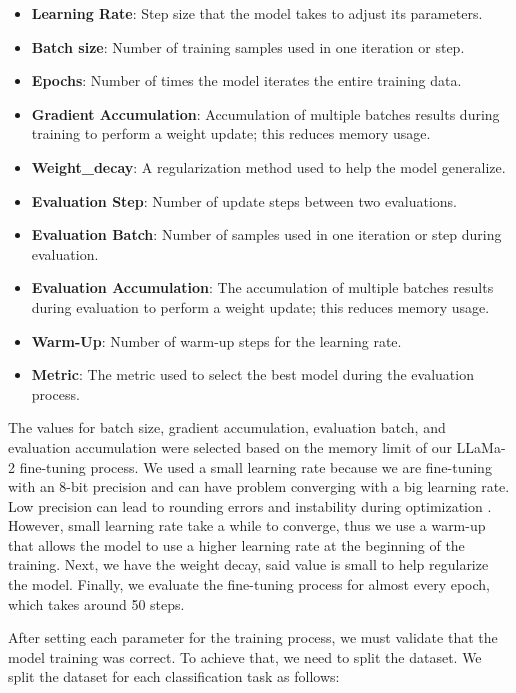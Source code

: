 \begin{itemize}
\item{\textbf{Learning Rate}}: Step size that the model takes to adjust its parameters.
\item{\textbf{Batch size}}: Number of training samples used in one iteration or step.
\item{\textbf{Epochs}}: Number of times the model iterates the entire training data.
\item{\textbf{Gradient Accumulation}}: Accumulation of multiple batches results during training to perform a weight update; this reduces memory usage.
\item{\textbf{Weight\_decay}}: A regularization method used to help the model generalize.
\item{\textbf{Evaluation Step}}: Number of update steps between two evaluations.
\item{\textbf{Evaluation Batch}}: Number of samples used in one iteration or step during evaluation.
\item{\textbf{Evaluation Accumulation}}: The accumulation of multiple batches results during evaluation to perform a weight update; this reduces memory usage.
\item{\textbf{Warm-Up}}: Number of warm-up steps for the learning rate.
\item{\textbf{Metric}}: The metric used to select the best model during the evaluation process.

\end{itemize}

\noindent The values for batch size, gradient accumulation, evaluation batch, and evaluation accumulation were selected based on the memory limit of our LLaMa-2 fine-tuning process. We used a small learning rate because we are fine-tuning with an 8-bit precision and can have problem converging with a big learning rate. Low precision can lead to rounding errors and instability during optimization \cite{jin2023rethinkinglearningratetuning}. However, small learning rate take a while to converge, thus we use a warm-up that allows the model to use a higher learning rate at the beginning of the training. Next, we have the weight decay, said value is small to help regularize the model. Finally, we evaluate the fine-tuning process for almost every epoch, which takes around 50 steps.

After setting each parameter for the training process, we must validate that the model training was correct. To achieve that, we need to split the dataset. We split the dataset for each classification task as follows: 

